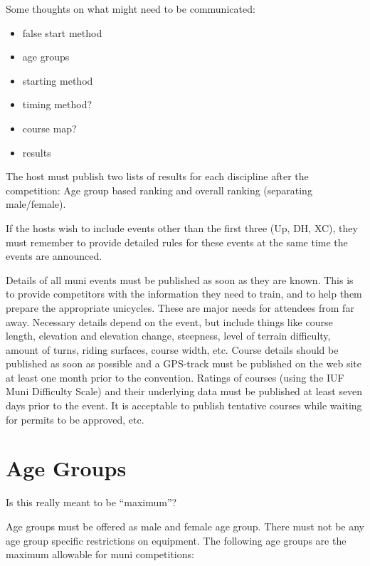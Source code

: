 \begin{comment2016}
Some thoughts on what might need to be communicated:
\begin{itemize}
\item false start method
\item age groups
\item starting method
\item timing method?
\item course map?
\item results
\end{itemize}
\end{comment2016}

The host must publish two lists of results for each discipline after the competition: Age group based ranking and overall ranking (separating male/female).

If the hosts wish to include events other than the first three (Up, DH, XC), they must remember to provide detailed rules for these events at the same time the events are announced.

Details of all muni events must be published as soon as they are known.
This is to provide competitors with the information they need to train, and to help them prepare the appropriate unicycles.
These are major needs for attendees from far away.
Necessary details depend on the event, but include things like course length, elevation and elevation change, steepness, level of terrain difficulty, amount of turns, riding surfaces, course width, etc.
Course details should be published as soon as possible and a GPS-track must be published on the web site at least one month prior to the convention.
Ratings of courses (using the IUF Muni Difficulty Scale) and their underlying data must be published at least seven days prior to the event.
It is acceptable to publish tentative courses while waiting for permits to be approved, etc.

\section{Age Groups}

\begin{comment2016}%
Is this really meant to be ``maximum''?
\end{comment2016}

Age groups must be offered as male and female age group.
There must not be any age group specific restrictions on equipment.
The following age groups are the maximum allowable for muni competitions:

